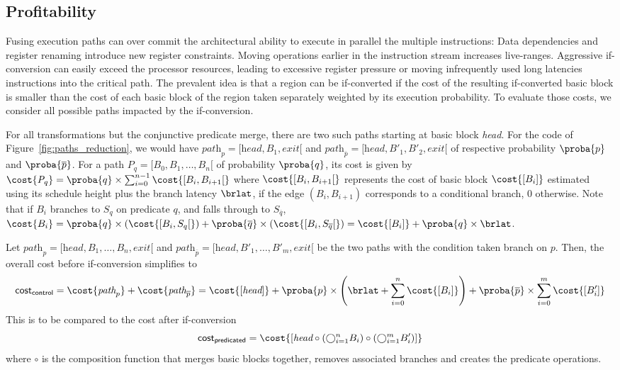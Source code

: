 \subsection{Profitability}

Fusing execution paths can over commit the architectural ability to execute in parallel the multiple instructions: Data dependencies and register renaming introduce new register constraints. Moving operations earlier in the instruction stream increases live-ranges. 
Aggressive if-conversion can easily exceed the processor resources, leading to excessive register pressure or moving infrequently used long latencies instructions into the critical path. 
The prevalent idea is that a region can be if-converted if the cost of the resulting if-converted basic block is smaller than the cost of each basic block of the region taken separately weighted by its execution probability. To evaluate those costs, we consider all possible paths impacted by the if-conversion. 

For all transformations but the conjunctive predicate merge, there are two such paths starting at basic block \textit{head}. For the code of Figure~\ref{fig:paths_reduction}, we would have $\textit{path}_p=[\textit{head}, B_1, \textit{exit}[$ and $\textit{path}_{\overline{p}}=[\textit{head}, B'_1, B'_2, \textit{exit}[$ of respective probability $\proba{p}$ and $\proba{\overline{p}}$. For a path $\textit{P}_q=[B_0, B_1, \dots, B_n[$ of probability $\proba{q}$, its cost is given by 
$\cost{\textit{P}_q}=\proba{q}\times \sum_{i=0}^{n-1} \cost{[B_i,B_{i+1}[}$ where $\cost{[B_i,B_{i+1}[}$ represents the cost of basic block $\cost{[B_i]}$ estimated using its schedule height plus the branch latency $\brlat$, if the edge $(B_i,B_{i+1})$ corresponds to a conditional branch, 0 otherwise. Note that if $B_i$ branches to $S_q$ on predicate $q$, and falls through to $S_{\overline{q}}$, $\cost{B_i}=\proba{q}\times \left(\cost{[B_i,S_q[}\right)+\proba{\overline{q}}\times \left(\cost{[B_i,S_{\overline{q}}[}\right)=\cost{[B_i]}+\proba{q}\times\brlat$.

Let $\textit{path}_p=[\textit{head}, B_1, \dots, B_n, \textit{exit}[$ and $\textit{path}_{\overline{p}}=[\textit{head}, B'_1, \dots, B'_m, \textit{exit}[$ be the two paths with the condition taken branch on $p$.
Then, the overall cost  before if-conversion  simplifies to
$$\textsf{cost}_{\textsf{control}}=\cost{\textit{path}_p}+\cost{\textit{path}_{\overline{p}}}=\cost{[\textit{head}]} + \proba{p}\times\left(\brlat+\sum_{i=0}^n \cost{[B_i]}\right) + \proba{\overline{p}}\times\sum_{i=0}^m \cost{[B'_i]}$$
This is to be compared to the cost after if-conversion
$$\textsf{cost}_{\textsf{predicated}}=\cost{\left[\textit{head} \circ \left(\bigcirc_{i=1}^n B_i\right)\circ \left(\bigcirc_{i=1}^m B'_i\right)  \right]}$$
where $\circ$ is the composition function that merges basic blocks together, removes associated branches and creates the predicate operations. 

